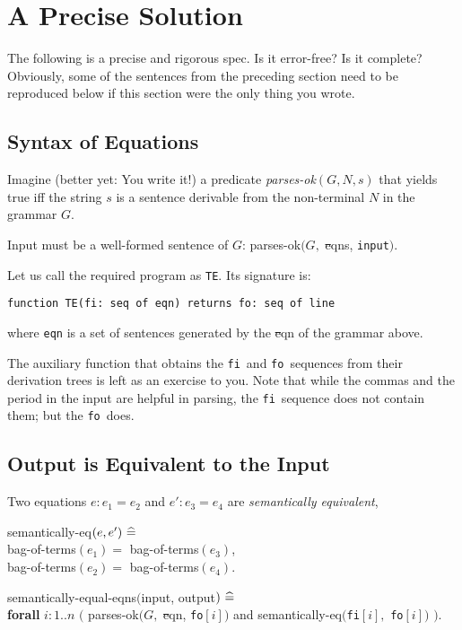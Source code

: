 \documentclass[12pt]{article}
\def\bnf{\st}
\def\zdef{\bf\ \widehat{=}\ }
\def\forall{{\bf forall }}
\def\ffi{{\tt fi}}
\def\ffo{{\tt fo}}
\begin{document}
\section{A Precise Solution}

\parindent=0pt

{\small The following is a precise and rigorous spec.  Is it
error-free?  Is it complete?  Obviously, some of the sentences from
the preceding section need to be reproduced below if this section were
the only thing you wrote.  }

\subsection{Syntax of Equations}

Imagine ({\small better yet: You write it!}) a predicate {\sl parses-ok$(G,
N, s)$} that yields true iff the string $s$ is a sentence derivable from
the non-terminal $N$ in the grammar $G$.


Input must be a well-formed sentence of $G$:
parses-ok$(G,$ {\bnf eqns}, {\tt input}$)$.


Let us call the required program as {\tt TE}.  Its signature is:

{\tt function TE(fi: seq of eqn) returns fo: seq of line}

\noindent
where {\tt eqn} is a set of sentences generated by the {\bnf eqn} of
the grammar above.

{\small The auxiliary function that obtains the \ffi\ and \ffo\ sequences
from their derivation trees is left as an exercise to you.  Note that
while the commas and the period in the input are helpful in parsing,
the \ffi\ sequence does not contain them; but the \ffo\ does.  }

\subsection{Output is Equivalent to the Input}

Two equations $e: e_1 = e_2$ and $e': e_3 = e_4$ are {\sl semantically
equivalent},

semantically-eq$(e, e') \zdef$\\
bag-of-terms$(e_1) = $ bag-of-terms$(e_3)$, \\
bag-of-terms$(e_2) = $ bag-of-terms$(e_4)$.

semantically-equal-eqns$($input, output$) \zdef$\\
\forall $i: 1..n$ $($
 parses-ok$(G,$ {\bnf eqn}, \ffo$[i])$ and
 semantically-eq$($\ffi$[i],$ \ffo$[i])$ $)$.
\end{document}
